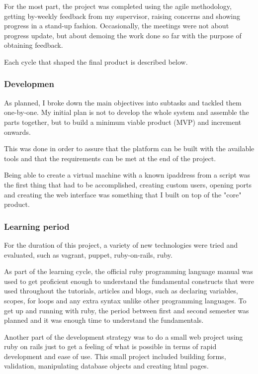 \documentclass{article}
\begin{document}
For the most part, the project was completed using the agile methodology, getting by-weekly feedback from my supervisor, raising concerns and showing progress in a stand-up fashion. Occasionally, the meetings were not about progress update, but about demoing the work done so far with the purpose of obtaining feedback.

Each cycle that shaped the final product is described below.
\subsubsection{Developmen}
As planned, I broke down the main objectives into subtasks and tackled them one-by-one. My initial plan is not to develop the whole system and assemble the parts together, but to build a minimum viable product (MVP) and increment onwards.

This was done in order to assure that the platform can be built with the available tools and that the requirements can be met at the end of the project.

Being able to create a virtual machine with a known \gls{ipaddress} from a script was the first thing that had to be accomplished, creating custom users, opening ports and creating the web interface was something that I built on top of the "core" product.

\subsubsection{Learning period}
For the duration of this project, a variety of new technologies were tried and evaluated, such as \gls{vagrant}, \gls{puppet}, \gls{ruby-on-rails}, \gls{ruby}.

As part of the learning cycle, the official ruby programming language manual was used to get proficient enough to understand the fundamental constructs that were used throughout the tutorials, articles and blogs, such as declaring variables, scopes, for loops and any extra syntax unlike other programming languages. To get up and running with \gls{ruby}, the period between first and second semester was planned and it was enough time to understand the fundamentals.

Another part of the development strategy was to do a small web project using ruby on rails just to get a feeling of what is possible in terms of rapid development and ease of use. This small project included building forms, validation, manipulating database objects and creating \gls{html} pages.
\end{document}
